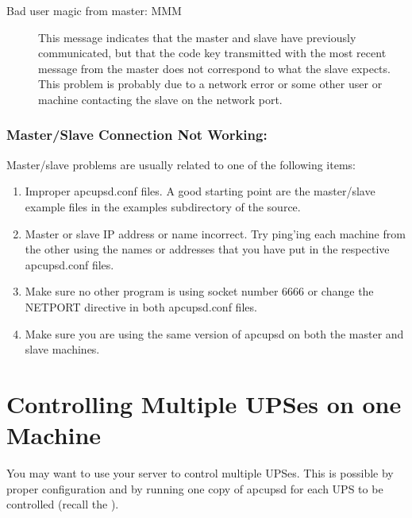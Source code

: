 {{{{{{{{\begin{description}
\item[Bad user magic from master: MMM]
   \label{Bad-user-magic-from-master_003b-MMM}
This message indicates that the master and slave have previously communicated,
but that the code key transmitted with the most recent message from the master
does not correspond to what the slave expects. This problem is probably due to
a network error or some other user or machine contacting the slave on the
network port. 
\end{description}

\label{Master_002fSlave-Connection-Not-Working}

\subsubsection*{Master/Slave Connection Not Working:}

Master/slave problems are usually related to one of the following items:  

\begin{enumerate}
\item Improper apcupsd.conf files. A good starting point are the master/slave
   example files in the examples subdirectory of the source.  
\item Master or slave IP address or name incorrect. Try ping'ing each machine
   from the other using the names or addresses that you have put in the
   respective apcupsd.conf files.  
\item Make sure no other program is using socket number 6666 or change the
   NETPORT directive in both apcupsd.conf files.  
\item Make sure you are using the same version of apcupsd on both the master
   and slave machines.  
   \end{enumerate}

\label{Controlling-Multiple-UPSes-on-one-Machine}

\section*{Controlling Multiple UPSes on one Machine}

You may want to use your server to control multiple UPSes. This is possible by
proper configuration and by running one copy of apcupsd for each UPS to be
controlled (recall the 
). 

}}}}}}}}
